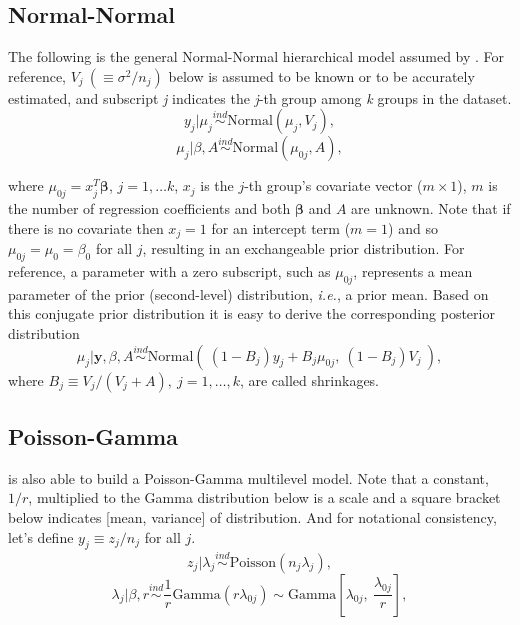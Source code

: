 \documentclass[article]{jss}
\begin{document}
\subsection[Normal-Normal]{Normal-Normal}
The following is the general Normal-Normal hierarchical model assumed by . For reference,  $V_{j}~(\equiv \sigma^{2}/n_{j})$ below is assumed to be known or to be accurately estimated, and subscript \emph{j} indicates the \emph{j}-th group among \emph{k} groups in the dataset.
\begin{equation}
y_{j}\vert \mu_{j} \stackrel{ind}{\sim}\textrm{Normal}(\mu_{j}, V_{j}),
\end{equation}
\begin{equation}
\mu_{j}\vert \beta, A\stackrel{ind}{\sim}\textrm{Normal}(\mu_{0j}, A),
\end{equation}

where $\mu_{0j} = x^{T}_{j} \mathbf{\beta}$, $j=1, \ldots k$, $x_{j}$ is the $j$-th group's covariate vector ($m\times 1$), $m$ is the number of regression coefficients and both $\mathbf{\beta}$ and $A$ are unknown. Note that if there is no covariate then $x_{j}=1$ for an intercept term ($m=1$) and so $\mu_{0j}=\mu_{0}=\beta_{0}$ for all $j$, resulting in an exchangeable prior distribution. For reference, a parameter with a zero subscript, such as $\mu_{0j}$, represents a mean parameter of the prior (second-level) distribution, \emph{i.e.}, a prior mean. Based on this conjugate prior distribution it is easy to derive the corresponding posterior distribution
\begin{equation} \label{normalpost}
\mu_{j}\vert \textbf{y}, \beta, A \stackrel{ind}{\sim}\textrm{Normal}(~(1-B_{j})y_{j} + B_{j}\mu_{0j},~(1-B_{j})V_{j}~),
\end{equation}
where $B_{j}\equiv V_{j}/(V_{j} + A),~j=1, \ldots, k$, are called shrinkages.

\subsection[Poisson-Gamma]{Poisson-Gamma}
 is also able to build a Poisson-Gamma multilevel model. Note that a constant, $1/r$, multiplied to the Gamma distribution below is a scale and a square bracket below indicates [mean, variance] of distribution. And for notational consistency, let's define $y_{j}\equiv z_{j} / n_{j}$ for all $j$.
\begin{equation}
z_{j}\vert \lambda_{j} \stackrel{ind}{\sim}\textrm{Poisson}(n_{j}\lambda_{j}),
\end{equation}
\begin{equation}
\lambda_{j}\vert \beta, r\stackrel{ind}{\sim}\frac{1}{r}\textrm{Gamma}(r\lambda_{0j})\sim \textrm{Gamma} \left[\lambda_{0j}, ~\frac{\lambda_{0j}}{r} \right],
\end{equation}
\end{document}
